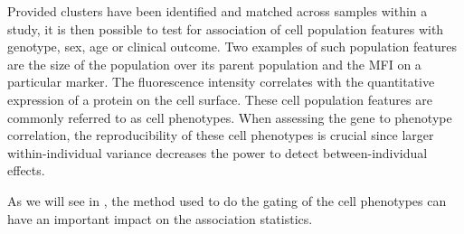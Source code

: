 Provided clusters have been identified and matched across samples within a study, it is then possible to test for association of cell population
features with genotype, sex, age or clinical outcome.
Two examples of such population features are the size of the population over its parent population and the \gls{MFI} on a particular marker.
The fluorescence intensity correlates with the quantitative expression of a protein on the cell surface.
These cell population features are commonly referred to as cell phenotypes.  
When assessing the gene to phenotype correlation, the reproducibility of these cell phenotypes is crucial since
larger within-individual variance decreases the power to detect between-individual effects.

As we will see in , the method used to do the gating of the cell phenotypes can have an important impact on the association
statistics.

%
%
%
%
%



